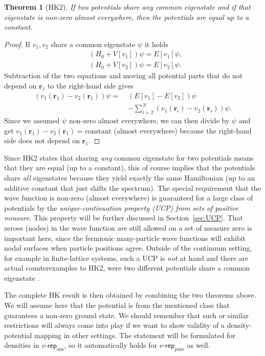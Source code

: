 \documentclass[journal=apcach,manuscript=article,layout=twocolumn]{achemso}
\newtheorem{theorem}{Theorem}
\newcommand{\rr}{\mathbf{r}}
\newcommand{\vrep}{\ensuremath{v\text{-}\mathsf{rep}}}
\newcommand{\vreppure}{\ensuremath{\vrep_\mathrm{pure}}}
\newcommand{\vrepens}{\ensuremath{\vrep_\mathrm{ens}}}
\begin{document}
\begin{theorem}[HK2]
If two potentials share any common eigenstate and if that eigenstate is non-zero almost everywhere, then the potentials are equal up to a constant.
\end{theorem}

\begin{proof}
If $v_1,v_2$ share a common eigenstate $\psi$ it holds
\begin{align*}
&(H_0 + V[v_1])\psi = E[v_1]\psi, \\
&(H_0 + V[v_2])\psi = E[v_2]\psi.
\end{align*}
Subtraction of the two equations and moving all potential parts that do not depend on $\rr_1$ to the right-hand side gives
\begin{equation}\label{eq:HK2-proof-step}
\begin{aligned}
(v_1(\rr_1)-v_2(\rr_1))\psi = \; & (E[v_1]-E[v_2])\psi \\ &- \sum_{i=2}^N (v_1(\rr_i)-v_2(\rr_i))\psi.
\end{aligned}
\end{equation}
%
Since we assumed $\psi$ non-zero almost everywhere, we can then divide by $\psi$ and get $v_1(\rr_1)-v_2(\rr_1) = \mathrm{constant}$ (almost everywhere) because the right-hand side does not depend on $\rr_1$.
\end{proof}

Since HK2 states that sharing \emph{any} common eigenstate for two potentials means that they are equal (up to a constant), this of course implies that the potentials share \emph{all} eigenstates because they yield exactly the same Hamiltonian (up to an additive constant that just shifts the spectrum).
The special requirement that the wave function is non-zero (almost everywhere) is guaranteed for a large class of potentials by the \emph{unique-continuation property (UCP) from sets of positive measure}. This property will be further discussed in Section~\ref{sec:UCP}. That zeroes (nodes) in the wave function \emph{are} still allowed on a set of measure zero is important here, since the fermionic many-particle wave functions will exhibit nodal surfaces when particle positions agree. Outside of the continuum setting, for example in finite-lattice systems, such a UCP is \emph{not} at hand and there are actual counterexamples to HK2, were two different potentials share a common eigenstate \cite{penz-DFT-graphs}.

The complete HK result is then obtained by combining the two theorems above. We will assume here that the potential is from the mentioned class that guarantees a non-zero ground state. We should remember that such or similar restrictions will always come into play if we want to show validity of a density-potential mapping in other settings. The statement will be formulated for densities in $\vrepens$, so it automatically holds for $\vreppure$ as well.
\end{document}
